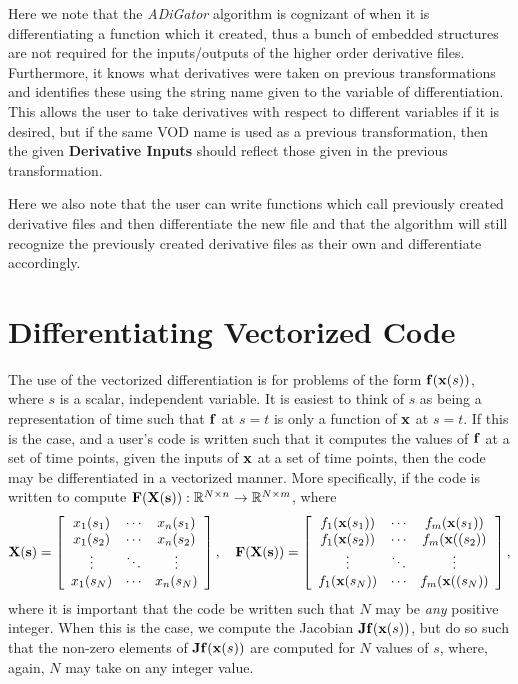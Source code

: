 \documentclass[10pt,pdftex]{article}
\begin{document}
Here we note that the \emph{ADiGator} algorithm is cognizant of when it is differentiating a function which it created, thus a bunch of embedded structures are not required for the inputs/outputs of the higher order derivative files. Furthermore, it knows what derivatives were taken on previous transformations and identifies these using the string name given to the variable of differentiation. This allows the user to take derivatives with respect to different variables if it is desired, but if the same VOD name is used as a previous transformation, then the given {\bf Derivative Inputs} should reflect those given in the previous transformation.

Here we also note that the user can write functions which call previously created derivative files and then differentiate the new file and that the algorithm will still recognize the previously created derivative files as their own and differentiate accordingly.

\section{Differentiating Vectorized Code}
The use of the vectorized differentiation is for problems of the form $\mathbf{f}(\mathbf{x}(s))$, where $s$ is a scalar, independent variable. It is easiest to think of $s$ as being a representation of time such that $\mathbf{f}$ at $s = t$ is only a function of $\mathbf{x}$ at $s = t$. If this is the case, and a user's code is written such that it computes the values of $\mathbf{f}$ at a set of time points, given the inputs of $\mathbf{x}$ at a set of time points, then the code may be differentiated in a vectorized manner. More specifically, if the code is written to compute $\mathbf{F}(\mathbf{X}(\mathbf{s})): \mathbb{R}^{N \times n} \rightarrow \mathbb{R}^{N \times m}$, where
\begin{equation}
\mathbf{X}(\mathbf{s}) = \left[ \begin{array}{ccc}
x_1(s_1) & \cdots & x_n(s_1)\\
x_1(s_2) & \cdots & x_n(s_2)\\
\vdots & \ddots & \vdots \\
x_1(s_N) & \cdots & x_n(s_N)
\end{array}\right], \quad
\mathbf{F}(\mathbf{X}(\mathbf{s})) = \left[ \begin{array}{ccc}
f_1(\mathbf{x}(s_1)) & \cdots & f_m(\mathbf{x}(s_1))\\
f_1(\mathbf{x}(s_2)) & \cdots & f_m(\mathbf{x}((s_2))\\
\vdots & \ddots & \vdots \\
f_1(\mathbf{x}(s_N)) & \cdots & f_m(\mathbf{x}((s_N))
\end{array}\right],
\end{equation}
where it is important that the code be written such that $N$ may be \emph{any} positive integer. When this is the case, we compute the Jacobian $\mathbf{J}\mathbf{f}(\mathbf{x}(s))$, but do so such that the non-zero elements of $\mathbf{J}\mathbf{f}(\mathbf{x}(s))$ are computed for $N$ values of $s$, where, again, $N$ may take on any integer value.
\end{document}
